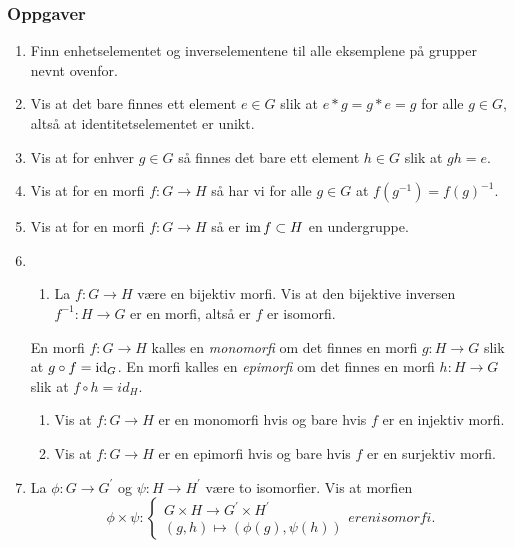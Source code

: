 \subsubsection*{Oppgaver}
\begin{enumerate}
    \item Finn enhetselementet og inverselementene til alle eksemplene på
        grupper nevnt ovenfor.
    \item Vis at det bare finnes ett element $e\in G$ slik
        at $e \ast g = g\ast e = g$ for alle $g\in G$,
        altså at identitetselementet er unikt.
    \item Vis at for enhver $g\in G$ så finnes det bare ett element
        $h\in G$ slik at $gh = e$.
    \item Vis at for en morfi $f\colon G\to H$
        så har vi for alle $g\in G$ at $f(g^{-1}) = {f(g)}^{-1}$.
    \item Vis at for en morfi $f\colon G\to H$ så er $\operatorname{im} f\subset H$ en undergruppe.
    \item
        \begin{enumerate}
            \item La $f\colon G\to H$ være en bijektiv morfi.
                Vis at den bijektive inversen $f^{-1}\colon H\to G$
                er en morfi, altså er $f$ er isomorfi.
        \end{enumerate}
        En morfi $f\colon G\to H$ kalles en \textit{monomorfi}
        om det finnes en morfi $g\colon H\to G$ slik at $g\circ f=\operatorname{id}_G$.
        En morfi kalles en \textit{epimorfi} om det finnes en morfi
        $h\colon H\to G$ slik at $f\circ h = id_H$.
        \begin{enumerate}[resume]
            \item Vis at $f\colon G\to H$ er en monomorfi hvis og bare hvis $f$
                er en injektiv morfi.
            \item Vis at $f\colon G\to H$ er en epimorfi hvis og bare hvis $f$
                er en surjektiv morfi.
        \end{enumerate}
    \item La $\phi\colon G\to G^\prime$ og $\psi\colon H\to H^\prime$
        være to isomorfier.
        Vis at morfien
        \[
            \phi\times\psi\colon\begin{cases}
                G\times H\to G^\prime\times H^\prime
                \\
                (g,h)\mapsto(\phi(g),\psi(h))
            \end{cases}
            er en isomorfi.
        \]
\end{enumerate}
